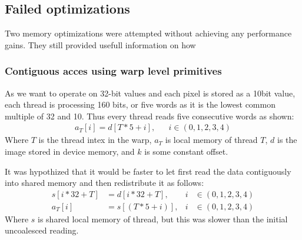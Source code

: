 \subsection{Failed optimizations}
Two memory optimizations were attempted without achieving any performance gains.
They still provided usefull information on how

\subsubsection{Contiguous acces using warp level primitives} \label{sec:contuguous_access}
As we want to operate on 32-bit values and each pixel is stored as a 10bit value, each thread is processing 160 bits, or five words as it is the lowest common multiple of 32 and 10.
Thus every thread reads five consecutive words as shown:
\begin{align}
    a_T[i] = d[T*5+i], &  & i \in (0,1,2,3,4)
\end{align}
Where $T$ is the thread intex in the warp, $a_T$ is local memory of thread $T$, $d$ is the image stored in device memory, and $k$ is some constant offset.

It was hypothized that it would be faster to let first read the data contiguously into shared memory and then redistribute it as follows:
\begin{align}
    s[i*32+T] & = d[i*32+T],  & i & \in (0,1,2,3,4) \\
    a_T[i]    & = s[(T*5+i)], & i & \in (0,1,2,3,4)
    \label{eq:contiguous_reading}
\end{align}
Where $s$ is shared local memory of thread, but this was slower than the initial uncoalesced reading.


